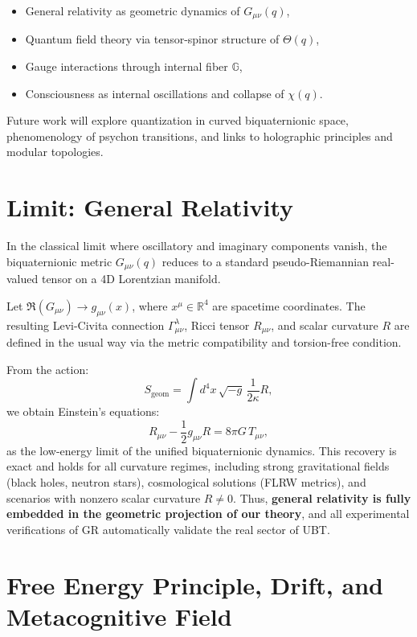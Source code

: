 \documentclass[12pt]{article}
\begin{document}
\begin{itemize}
  \item General relativity as geometric dynamics of \( G_{\mu\nu}(q) \),
  \item Quantum field theory via tensor-spinor structure of \( \Theta(q) \),
  \item Gauge interactions through internal fiber \( \mathbb{G} \),
  \item Consciousness as internal oscillations and collapse of \( \chi(q) \).
\end{itemize}

Future work will explore quantization in curved biquaternionic space, phenomenology of psychon transitions, and links to holographic principles and modular topologies.

\section{Limit: General Relativity}

In the classical limit where oscillatory and imaginary components vanish, the biquaternionic metric \( G_{\mu\nu}(q) \) reduces to a standard pseudo-Riemannian real-valued tensor on a 4D Lorentzian manifold.

Let \( \Re(G_{\mu\nu}) \rightarrow g_{\mu\nu}(x) \), where \( x^\mu \in \mathbb{R}^4 \) are spacetime coordinates. The resulting Levi-Civita connection \( \Gamma^\lambda_{\mu\nu} \), Ricci tensor \( R_{\mu\nu} \), and scalar curvature \( R \) are defined in the usual way via the metric compatibility and torsion-free condition.

From the action:
\[
S_\text{geom} = \int d^4 x \, \sqrt{-g} \, \frac{1}{2\kappa} R,
\]
we obtain Einstein’s equations:
\[
R_{\mu\nu} - \frac{1}{2} g_{\mu\nu} R = 8 \pi G \, T_{\mu\nu},
\]
as the low-energy limit of the unified biquaternionic dynamics. This recovery is exact and holds for all curvature regimes, including strong gravitational fields (black holes, neutron stars), cosmological solutions (FLRW metrics), and scenarios with nonzero scalar curvature $R \neq 0$. Thus, \textbf{general relativity is fully embedded in the geometric projection of our theory}, and all experimental verifications of GR automatically validate the real sector of UBT.


\section{Free Energy Principle, Drift, and Metacognitive Field}
\end{document}
